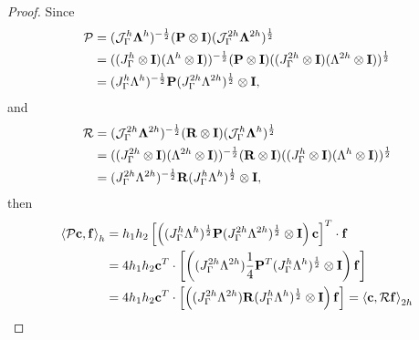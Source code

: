 \begin{proof}
	Since 
	\begin{align*}
	{\mathcal{P}} &= (\mathcal{J}^h_\Gamma \bm{\Lambda}^h)^{-\frac{1}{2}}({\bf P}\otimes{\bf I})(\mathcal{J}^{2h}_\Gamma \bm{\Lambda}^{2h})^{\frac{1}{2}}\\
	& = ((J_{\Gamma}^h\otimes{\bf I})(\Lambda^h\otimes{\bf I}))^{-\frac{1}{2}}({\bf P}\otimes{\bf I})((J_{\Gamma}^{2h}\otimes{\bf I})(\Lambda^{2h}\otimes{\bf I}))^{\frac{1}{2}}\\
	& = (J_{\Gamma}^h\Lambda^h)^{-\frac{1}{2}}{\bf P}(J_{\Gamma}^{2h}\Lambda^{2h})^{\frac{1}{2}}\otimes{\bf I},
	\end{align*}
	and
	\begin{align*}
	{\mathcal{R}} &= (\mathcal{J}^{2h}_\Gamma \bm{\Lambda}^{2h})^{-\frac{1}{2}}({\bf R}\otimes{\bf I})(\mathcal{J}^{h}_\Gamma \bm{\Lambda}^{h})^{\frac{1}{2}}\\
	& = ((J_{\Gamma}^{2h}\otimes{\bf I})(\Lambda^{2h}\otimes{\bf I}))^{-\frac{1}{2}}({\bf R}\otimes{\bf I})((J_{\Gamma}^{h}\otimes{\bf I})(\Lambda^{h}\otimes{\bf I}))^{\frac{1}{2}}\\
	& = (J_{\Gamma}^{2h}\Lambda^{2h})^{-\frac{1}{2}}{\bf R}(J_{\Gamma}^{h}\Lambda^{h})^{\frac{1}{2}}\otimes{\bf I},
	\end{align*}
	then
	\begin{align*}
	\left<\mathcal{P}{\bf c}, {\bf f}\right>_h &= h_1h_2\left[\left((J_{\Gamma}^h\Lambda^h)^{\frac{1}{2}} {\bf P}(J_{\Gamma}^{2h}\Lambda^{2h})^{\frac{1}{2}}\otimes {\bf I}\right){\bf c}\right]^T\cdot{\bf f}\\
	& = 4h_1h_2 {\bf c}^T \cdot \left[\left((J_{\Gamma}^{2h}\Lambda^{2h})\frac{1}{4}{\bf P}^T(J_{\Gamma}^h\Lambda^h)^{\frac{1}{2}}\otimes {\bf I}\right) {\bf f}\right]\\
	& =4h_1h_2 {\bf c}^T \cdot \left[\left((J_{\Gamma}^{2h}\Lambda^{2h}){\bf R}(J_{\Gamma}^h\Lambda^h)^{\frac{1}{2}}\otimes {\bf I}\right) {\bf f}\right] = \left<{\bf c}, \mathcal{R}{\bf f}\right>_{2h}
	\end{align*}
\end{proof}

